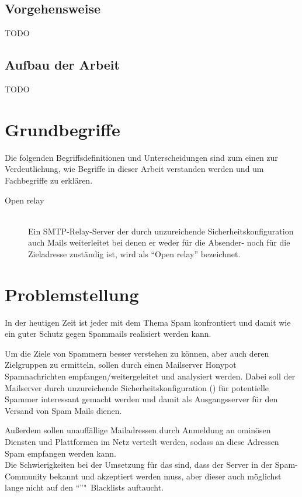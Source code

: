 \documentclass[a4paper,11pt,singlespacing]{article}
\begin{document}
	\subsection{Vorgehensweise}\label{sec:Vorgehensweise}
		TODO

	\subsection{Aufbau der Arbeit}\label{sec:Aufbau}
		TODO


\section{Grundbegriffe}\label{sec:Grundbegriffe}
	Die folgenden Begriffsdefinitionen und Unterscheidungen sind zum einen zur Verdeutlichung, wie Begriffe in dieser Arbeit verstanden werden und um Fachbegriffe zu erklären.
	
	\begin{description}
	\item[Open relay\label{itm:OpenRelay}]\hfill \\
		Ein SMTP-Relay-Server der durch unzureichende Sicherheitskonfiguration auch Mails weiterleitet bei denen er weder für die Absender- noch für die Zieladresse zuständig ist, wird als "`Open relay"' bezeichnet.\cite{SMTP-Relay-Server}
	\end{description}


\section{Problemstellung}\label{sec:Problemstellung}
	In der heutigen Zeit ist jeder mit dem Thema Spam konfrontiert und damit wie ein guter Schutz gegen Spammails realisiert werden kann.	
	
	Um die Ziele von Spammern besser verstehen zu können, aber auch deren Zielgruppen zu ermitteln, sollen durch einen Mailserver Honypot Spamnachrichten empfangen/weitergeleitet und analysiert werden. 
	Dabei soll der Mailserver durch unzureichende Sicherheitskonfiguration () für potentielle Spammer interessant gemacht werden und damit als Ausgangsserver für den Versand von Spam Mails dienen.
	
	Außerdem sollen unauffällige Mailadressen durch Anmeldung an ominösen Diensten und Plattformen im Netz verteilt werden, sodass an diese Adressen Spam empfangen werden kann.\\
	
	Die Schwierigkeiten bei der Umsetzung für das  sind, dass der Server in der Spam-Community bekannt und akzeptiert werden muss, aber dieser auch möglichst lange nicht auf den "`"'"~Blacklists auftaucht.
	
\end{document}
